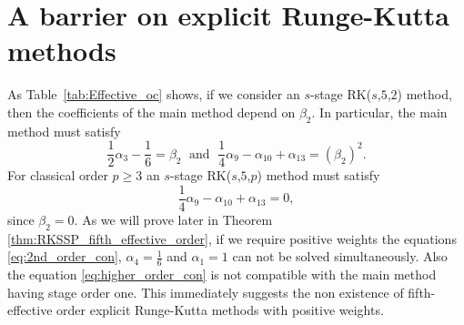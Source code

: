 \section{A barrier on explicit Runge-Kutta methods}\label{sec:ExRK_barrier}

\indent As Table~\ref{tab:Effective_oc} shows, if we consider an $s$-stage RK($s$,$5$,$2$) method, then the coefficients of the main method depend on $\beta_2$. In particular, the main method must satisfy
\begin{equation}\label{eq:2nd_order_con}
    \frac{1}{2}\alpha_3 - \frac{1}{6} = \beta_2 \; \text{ and } \; \frac{1}{4}\alpha_9 - \alpha_{10} + \alpha_{13} = (\beta_2)^2.
\end{equation}
For classical order $p \geq 3$ an $s$-stage RK($s$,$5$,$p$) method must satisfy
\begin{equation}\label{eq:higher_order_con}
    \frac{1}{4}\alpha_9- \alpha_{10} + \alpha_{13} = 0,
\end{equation}
since $\beta_2 = 0$. As we will prove later in Theorem \ref{thm:RKSSP_fifth_effective_order}, if we require positive weights the equations \eqref{eq:2nd_order_con}, $\alpha_4 = \frac{1}{6}$ and $\alpha_1 = 1$ can not be solved simultaneously. Also the equation \eqref{eq:higher_order_con} is not compatible with the main method having stage order one. This immediately suggests the non existence of fifth-effective order explicit Runge-Kutta methods with positive weights.

